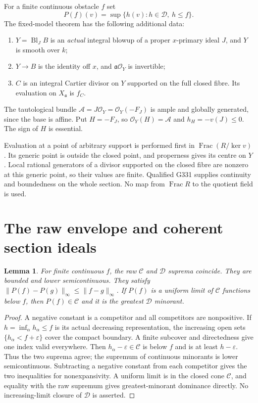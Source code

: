 \documentclass[11pt]{article}
\newtheorem{lemma}[theorem]{Lemma}
\newcommand{\cC}{\mathcal C}
\newcommand{\cD}{\mathcal D}
\newcommand{\OO}{\mathcal O}
\newcommand{\eps}{\varepsilon}
\begin{document}
For a finite continuous obstacle $f$ set
\[
 P(f)(v)=\sup\{h(v):h\in\cD,\ h\leq f\}.
\]
The fixed-model theorem has the following additional data:
\begin{enumerate}
\item $Y=\operatorname{Bl}_{J} B$ is an \emph{actual} integral blowup of a
proper $x$-primary ideal $J$, and $Y$ is smooth over $k$;
\item $Y\to B$ is the identity off $x$, and $\mathfrak a\OO_Y$ is
invertible;
\item $C$ is an integral Cartier divisor on $Y$ supported on the full
closed fibre. Its evaluation on $X_{\mathfrak a}$ is $f_C$.
\end{enumerate}
The tautological bundle
$\mathcal A=J\OO_Y=\OO_Y(-F_J)$ is ample and globally generated, since
the base is affine. Put $H=-F_J$, so $\OO_Y(H)=\mathcal A$ and
$h_H=-v(J)\leq0$. The sign of $H$ is essential.

Evaluation at a point of arbitrary support is performed first in
$\operatorname{Frac}(R/\ker v)$. Its generic point is outside the closed
point, and properness gives its centre on $Y$. Local rational generators
of a divisor supported on the closed fibre are nonzero at this generic
point, so their values are finite. Qualified G331 supplies continuity and
boundedness on the whole section. No map from $\operatorname{Frac}R$ to
the quotient field is used.

\section{The raw envelope and coherent section ideals}
\begin{lemma}\label{lem:raw}
For finite continuous $f$, the raw $\cC$ and $\cD$ suprema coincide.
They are bounded and lower semicontinuous. They satisfy
$\|P(f)-P(g)\|_\infty\leq\|f-g\|_\infty$.
If $P(f)$ is a uniform limit of $\cC$ functions below $f$, then
$P(f)\in\cC$ and it is the greatest $\cD$ minorant.
\end{lemma}
\begin{proof}
A negative constant is a competitor and all competitors are nonpositive.
If $h=\inf_\alpha h_\alpha\leq f$ is its actual decreasing representation,
the increasing open sets $\{h_\alpha<f+\eps\}$ cover the compact boundary.
A finite subcover and directedness give one index valid everywhere.
Then $h_\alpha-\eps\in\cC$ is below $f$ and is at least $h-\eps$.
Thus the two suprema agree; the supremum of continuous minorants is lower
semicontinuous. Subtracting a negative constant from each competitor gives
the two inequalities for nonexpansivity. A uniform limit is in the closed
cone $\cC$, and equality with the raw supremum gives greatest-minorant
dominance directly. No increasing-limit closure of $\cD$ is asserted.
\end{proof}
\end{document}

